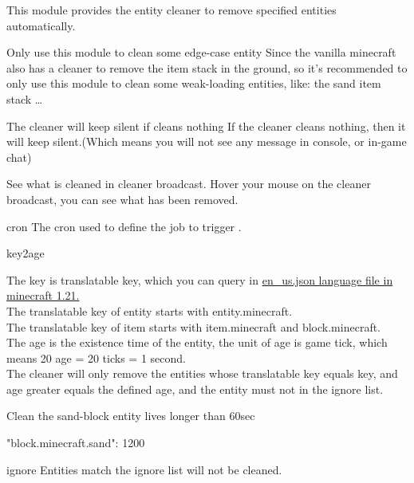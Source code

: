 
This module provides the entity cleaner to remove specified entities automatically.

\begin{note}{Only use this module to clean some edge-case entity}
    Since the vanilla minecraft also has a cleaner to remove the item stack in the ground, so it's recommended to only use this module to clean some weak-loading entities, like: the sand item stack \ldots
\end{note}


\begin{note}{The cleaner will keep silent if cleans nothing}
    If the cleaner cleans nothing, then it will keep silent.(Which means you will not see any message in console, or in-game chat)
\end{note}

\begin{tips}{See what is cleaned in cleaner broadcast.}
    Hover your mouse on the cleaner broadcast, you can see what has been removed.
\end{tips}

\begin{Configuration}
    \item[cron]{
        The cron used to define the job to trigger .
    }

    \item[key2age]{
        The key is translatable key, which you can query in \href{https://github.com/sakurawald/fuji-fabric/blob/dev/.github/files/en_us.json}{en\_us.json language file in minecraft 1.21.} \\
        The translatable key of entity starts with entity.minecraft. \\
        The translatable key of item starts with item.minecraft and block.minecraft. \\
        The age is the existence time of the entity, the unit of age is game tick, which means 20 age = 20 ticks = 1 second. \\
        The cleaner will only remove the entities whose translatable key equals key, and age greater equals the defined age, and the entity must not in the ignore list.

        \begin{example}{Clean the sand-block entity lives longer than 60sec}
            \begin{json}
                "block.minecraft.sand": 1200
            \end{json}
        \end{example}
    }

    \item[ignore]{
        Entities match the ignore list will not be cleaned.
    }

\end{Configuration}


